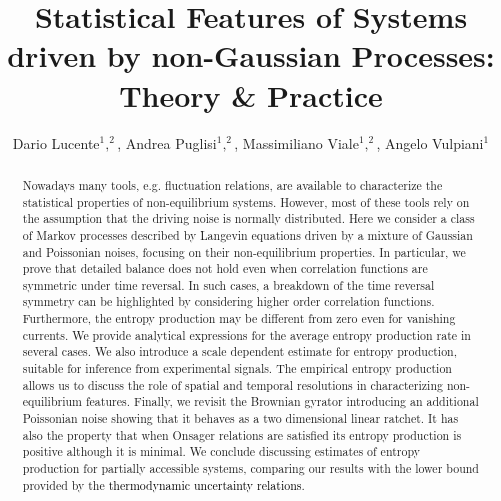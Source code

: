 \documentclass[12pt]{iopart}
\begin{document}
\title[Statistical Features of Systems driven by non-Gaussian Processes]{Statistical Features of Systems driven by non-Gaussian Processes: Theory \& Practice}
\author{Dario Lucente$^1,^2$, Andrea Puglisi$^1,^2$, Massimiliano Viale$^1,^2$, Angelo Vulpiani$^1$} 

\address{$^1$ Dipartimento di Fisica - Universit\`a La Sapienza - 00185 Rome, Italy}
\address{$^2$ Istituto dei Sistemi Complessi - Consiglio Nazionale delle Ricerche, 00185 Rome, Italy}
\begin{abstract}
    Nowadays many tools, e.g. fluctuation relations, are available to characterize the statistical properties of non-equilibrium systems. However, most of these tools rely on the assumption that the driving noise is normally distributed. Here we consider a class of Markov processes described by Langevin equations driven by a mixture of Gaussian and Poissonian noises, focusing on their non-equilibrium properties. In particular, we prove that detailed balance does not hold even when correlation functions  are symmetric under time reversal. In such cases, a breakdown of the time reversal symmetry can be highlighted by considering higher order correlation functions. Furthermore, the entropy production may be different from zero even for vanishing currents. We provide analytical expressions for the average entropy production rate in several cases. We also introduce a scale dependent estimate for entropy production, suitable for inference from experimental signals. The empirical entropy production allows us to discuss the role of spatial and temporal resolutions in characterizing non-equilibrium features. Finally, we revisit the Brownian gyrator introducing an additional Poissonian noise showing that it behaves as a two dimensional linear ratchet. It has also the property that when Onsager relations are satisfied its entropy production is  positive although it is minimal. We conclude discussing estimates of entropy production for partially accessible systems, comparing our results with the lower bound provided by the \textcolor{black}{thermodynamic uncertainty relations}. 
\end{abstract}
\end{document}

